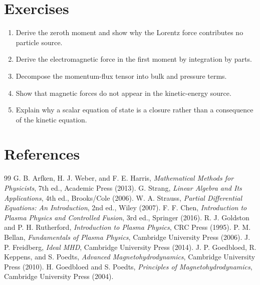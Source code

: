 \documentclass[11pt]{article}
\begin{document}
\section{Exercises}
\begin{enumerate}[leftmargin=1.8em]
\item Derive the zeroth moment and show why the Lorentz force contributes no particle source.
\item Derive the electromagnetic force in the first moment by integration by parts.
\item Decompose the momentum-flux tensor into bulk and pressure terms.
\item Show that magnetic forces do not appear in the kinetic-energy source.
\item Explain why a scalar equation of state is a closure rather than a consequence of the kinetic equation.
\end{enumerate}

\section{References}
\begin{thebibliography}{99}
 G. B. Arfken, H. J. Weber, and F. E. Harris, \emph{Mathematical Methods for Physicists}, 7th ed., Academic Press (2013).
 G. Strang, \emph{Linear Algebra and Its Applications}, 4th ed., Brooks/Cole (2006).
 W. A. Strauss, \emph{Partial Differential Equations: An Introduction}, 2nd ed., Wiley (2007).
 F. F. Chen, \emph{Introduction to Plasma Physics and Controlled Fusion}, 3rd ed., Springer (2016).
 R. J. Goldston and P. H. Rutherford, \emph{Introduction to Plasma Physics}, CRC Press (1995).
 P. M. Bellan, \emph{Fundamentals of Plasma Physics}, Cambridge University Press (2006).
 J. P. Freidberg, \emph{Ideal MHD}, Cambridge University Press (2014).
 J. P. Goedbloed, R. Keppens, and S. Poedts, \emph{Advanced Magnetohydrodynamics}, Cambridge University Press (2010).
 H. Goedbloed and S. Poedts, \emph{Principles of Magnetohydrodynamics}, Cambridge University Press (2004).
\end{thebibliography}
\end{document}
